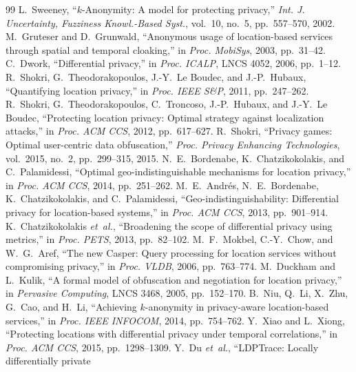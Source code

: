 \documentclass[10pt,journal,compsoc]{IEEEtran}
\begin{document}
\begin{thebibliography}{99}
 L.~Sweeney, ``$k$-Anonymity: A model for protecting
privacy,'' \emph{Int. J. Uncertainty, Fuzziness Knowl.-Based Syst.}, vol.~10,
no.~5, pp.~557--570, 2002.
 M.~Gruteser and D.~Grunwald, ``Anonymous usage of
location-based services through spatial and temporal cloaking,'' in \emph{Proc.
MobiSys}, 2003, pp.~31--42.
 C.~Dwork, ``Differential privacy,'' in \emph{Proc. ICALP},
LNCS 4052, 2006, pp.~1--12.
 R.~Shokri, G.~Theodorakopoulos, J.-Y.~Le Boudec, and
J.-P.~Hubaux, ``Quantifying location privacy,'' in \emph{Proc. IEEE S\&P}, 2011,
pp.~247--262.
 R.~Shokri, G.~Theodorakopoulos, C.~Troncoso, J.-P.~Hubaux,
and J.-Y.~Le Boudec, ``Protecting location privacy: Optimal strategy against
localization attacks,'' in \emph{Proc. ACM CCS}, 2012, pp.~617--627.
 R.~Shokri, ``Privacy games: Optimal user-centric data
obfuscation,'' \emph{Proc. Privacy Enhancing Technologies}, vol.~2015, no.~2,
pp.~299--315, 2015.
 N.~E.~Bordenabe, K.~Chatzikokolakis, and C.~Palamidessi,
``Optimal geo-indistinguishable mechanisms for location privacy,'' in \emph{Proc.
ACM CCS}, 2014, pp.~251--262.
 M.~E.~Andr\'{e}s, N.~E.~Bordenabe, K.~Chatzikokolakis, and
C.~Palamidessi, ``Geo-indistinguishability: Differential privacy for
location-based systems,'' in \emph{Proc. ACM CCS}, 2013, pp.~901--914.
 K.~Chatzikokolakis \emph{et~al.}, ``Broadening the
scope of differential privacy using metrics,'' in \emph{Proc. PETS}, 2013,
pp.~82--102.
 M.~F.~Mokbel, C.-Y.~Chow, and W.~G.~Aref, ``The new Casper:
Query processing for location services without compromising privacy,'' in
\emph{Proc. VLDB}, 2006, pp.~763--774.
 M.~Duckham and L.~Kulik, ``A formal model of obfuscation and
negotiation for location privacy,'' in \emph{Pervasive Computing}, LNCS 3468,
2005, pp.~152--170.
 B.~Niu, Q.~Li, X.~Zhu, G.~Cao, and H.~Li, ``Achieving
$k$-anonymity in privacy-aware location-based services,'' in \emph{Proc. IEEE
INFOCOM}, 2014, pp.~754--762.
 Y.~Xiao and L.~Xiong, ``Protecting locations with differential
privacy under temporal correlations,'' in \emph{Proc. ACM CCS}, 2015,
pp.~1298--1309.
 Y.~Du \emph{et~al.}, ``LDPTrace: Locally differentially private

\end{thebibliography}
\end{document}
